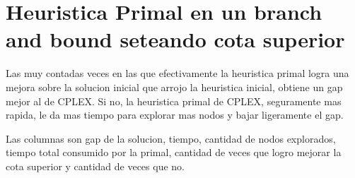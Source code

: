 \documentclass[landscape, 12pt]{report}
\begin{document}
\clearpage

\section*{Heuristica Primal en un branch and bound seteando cota superior}

Las muy contadas veces en las que efectivamente la heuristica primal logra una mejora sobre la solucion inicial que arrojo la heuristica inicial, obtiene un gap mejor al de CPLEX. Si no, la heuristica primal de CPLEX, seguramente mas rapida, le da mas tiempo para explorar mas nodos y bajar ligeramente el gap.

Las columnas son gap de la solucion, tiempo, cantidad de nodos explorados, tiempo total consumido por la primal, cantidad de veces que logro mejorar la cota superior y cantidad de veces que no.
\end{document}
